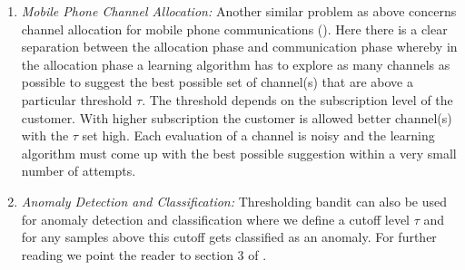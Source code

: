 \begin{enumerate}
\item \emph{Mobile Phone Channel Allocation:} Another similar problem as above concerns channel allocation for mobile phone communications (\cite{audibert2009exploration}). Here there is a clear separation between the allocation phase and communication phase whereby in the allocation phase a learning algorithm has to explore as many channels as possible to suggest the best possible set of channel(s) that are above a particular threshold $\tau$. The threshold depends on the subscription level of the customer. With higher subscription the customer is allowed better channel(s) with the $\tau$ set high. Each evaluation of a channel is noisy and the learning algorithm must come up with the best possible suggestion within a very small  number of attempts.
\item \emph{Anomaly Detection and Classification:} Thresholding bandit can also be used for anomaly detection and classification where we define a cutoff level $\tau$ and for any samples above this cutoff gets classified as an anomaly. For further reading we point the reader to section 3 of \cite{locatelli2016optimal}.
\end{enumerate}

